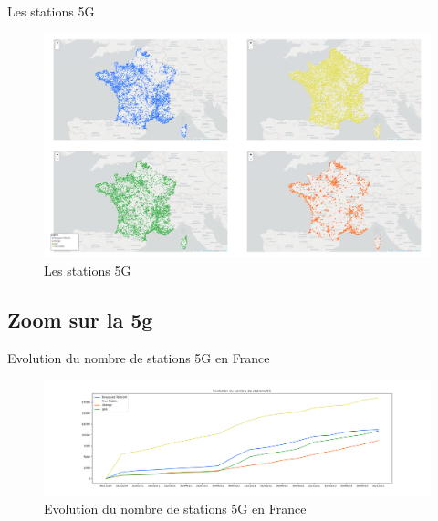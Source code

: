 \begin{frame}{Les stations 5G}
    \begin{figure}
        \includegraphics[width=0.9\paperheight]{images/cartes/providers-site_5g.png}
        \caption{\label{fig:sp-5g}Les stations 5G}
    \end{figure}
\end{frame}


\subsection{Zoom sur la 5g}
\insertsubsectionframe

\begin{frame}{Evolution du nombre de stations 5G en France}
    \begin{figure}
        \includegraphics[height=0.5\paperheight]{images/5G-evolution.png}
        \caption{\label{fig:5G-ev}Evolution du nombre de stations 5G en France}
    \end{figure}
\end{frame}



